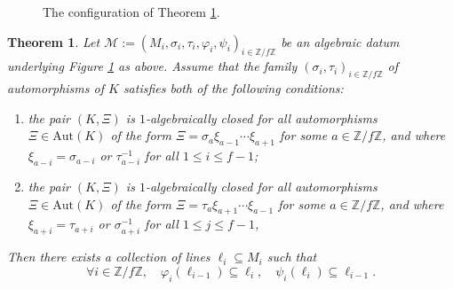 \documentclass[12pt]{amsart}
\newtheorem{theorem}{Theorem}[section]
\theoremstyle{definition}
\newcommand{\<}{\langle}   %
\renewcommand{\>}{\rangle} %
\begin{document}
\begin{figure} 
\centering
{}
\caption{The configuration of Theorem \ref{MaintheoremC}.}
\label{Figure6}
\end{figure}



\begin{theorem}\label{MaintheoremC}
Let $\mathcal M := (M_i,\sigma_i,\tau_i,\varphi_i,\psi_i)_{i\in \mathbb Z/f\mathbb Z}$ be an algebraic datum underlying Figure \ref{Figure6} as above.  Assume that the family $(\sigma_i,\tau_i)_{i \in \mathbb Z/f\mathbb Z}$ of automorphisms of $K$  satisfies both of the following conditions:
\begin{enumerate}[label=\Alph*]
    \item \label{Condition1-algebraicallyclosedA} the pair $(K,\Xi)$ is $1$-algebraically closed for all automorphisms $\Xi \in \mathrm{Aut}(K)$ of the form $\Xi = \sigma_{a}\xi_{a-1}\cdots\xi_{a+1}$ for some $a \in \mathbb Z/f\mathbb Z$, and where $\xi_{a-i} = \sigma_{a-i}$ or $\tau_{a-i}^{-1}$ for all $1 \leq i \leq f-1$;
    \item \label{Condition1-algebraicallyclosedB} the pair $(K,\Xi)$ is $1$-algebraically closed for all automorphisms $\Xi \in \mathrm{Aut}(K)$ of the form $\Xi = \tau_{a}\xi_{a+1} \cdots \xi_{a-1}$ for some $a \in \mathbb Z/f\mathbb Z$, and where $\xi_{a+i} = \tau_{a+i}$ or $\sigma_{a+i}^{-1}$ for all $1 \leq j \leq f-1$,
\end{enumerate}
     Then there exists a collection of lines $\ell_i \subseteq M_i$ such that 
    \begin{equation*}
        \forall i \in \mathbb Z/f\mathbb Z, \quad \varphi_i(\ell_{i-1}) \subseteq \ell_i, \quad \psi_{i}(\ell_i) \subseteq \ell_{i-1}.
    \end{equation*}
\end{theorem}
\end{document}
